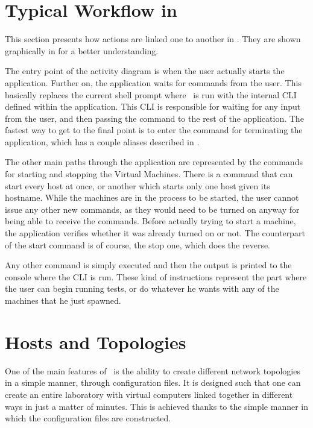 \section{Typical Workflow in \project}
\label{sec:typical-workflow}

This section presents how actions are linked one to another in \project.
They are shown graphically in  for a better understanding.


The entry point of the activity diagram is when the user actually starts the application.
Further on, the application waits for commands from the user.
This basically replaces the current shell prompt where \project\ is run with the internal CLI defined within the application.
This CLI is responsible for waiting for any input from the user, and then passing the command to the rest of the application.
The fastest way to get to the final point is to enter the command for terminating the application, which has a couple aliases described in .

The other main paths through the application are represented by the commands for starting and stopping the Virtual Machines.
There is a command that can start every host at once, or another which starts only one host given its hostname.
While the machines are in the process to be started, the user cannot issue any other new commands, as they would need to be turned on anyway for being able to receive the commands.
Before actually trying to start a machine, the application verifies whether it was already turned on or not.
The counterpart of the start command is of course, the stop one, which does the reverse.

Any other command is simply executed and then the output is printed to the console where the CLI is run.
These kind of instructions represent the part where the user can begin running tests, or do whatever he wants with any of the machines that he just spawned.

\section{Hosts and Topologies}
\label{sec:hosts-and-topologies}

One of the main features of \project\ is the ability to create different network topologies in a simple manner, through configuration files.
It is designed such that one can create an entire laboratory with virtual computers linked together in different ways in just a matter of minutes.
This is achieved thanks to the simple manner in which the configuration files are constructed.

